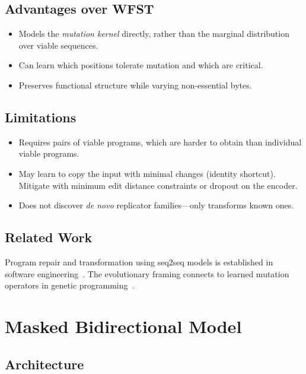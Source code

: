\documentclass{article}
\begin{document}
\subsection{Advantages over WFST}

\begin{itemize}
  \item Models the \emph{mutation kernel} directly, rather than the marginal
        distribution over viable sequences.
  \item Can learn which positions tolerate mutation and which are critical.
  \item Preserves functional structure while varying non-essential bytes.
\end{itemize}

\subsection{Limitations}

\begin{itemize}
  \item Requires pairs of viable programs, which are harder to obtain than
        individual viable programs.
  \item May learn to copy the input with minimal changes (identity shortcut).
        Mitigate with minimum edit distance constraints or dropout on the
        encoder.
  \item Does not discover \emph{de novo} replicator families---only
        transforms known ones.
\end{itemize}

\subsection{Related Work}

Program repair and transformation using seq2seq models is established
in software engineering~\cite{tufano2019empirical}.  The evolutionary
framing connects to learned mutation operators in
genetic programming~\cite{chen2020program}.


\section{Masked Bidirectional Model}
\label{sec:masked}

\subsection{Architecture}
\end{document}
